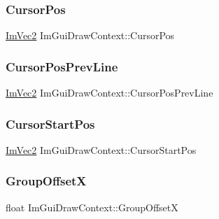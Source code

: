 \hypertarget{struct_im_gui_draw_context_a1f566246492e0995b5182de23633dc9a}{}\label{struct_im_gui_draw_context_a1f566246492e0995b5182de23633dc9a} 
\subsubsection{\texorpdfstring{Cursor\+Pos}{CursorPos}}
{\footnotesize\ttfamily \hyperlink{struct_im_vec2}{Im\+Vec2} Im\+Gui\+Draw\+Context\+::\+Cursor\+Pos}

\hypertarget{struct_im_gui_draw_context_adf64144a8421a21d7350d0452739eca2}{}\label{struct_im_gui_draw_context_adf64144a8421a21d7350d0452739eca2} 
\subsubsection{\texorpdfstring{Cursor\+Pos\+Prev\+Line}{CursorPosPrevLine}}
{\footnotesize\ttfamily \hyperlink{struct_im_vec2}{Im\+Vec2} Im\+Gui\+Draw\+Context\+::\+Cursor\+Pos\+Prev\+Line}

\hypertarget{struct_im_gui_draw_context_aef16fef5d6781908d806479fd37f393f}{}\label{struct_im_gui_draw_context_aef16fef5d6781908d806479fd37f393f} 
\subsubsection{\texorpdfstring{Cursor\+Start\+Pos}{CursorStartPos}}
{\footnotesize\ttfamily \hyperlink{struct_im_vec2}{Im\+Vec2} Im\+Gui\+Draw\+Context\+::\+Cursor\+Start\+Pos}

\hypertarget{struct_im_gui_draw_context_a30473e3e4b3eeba6c8d1acdaaedecba9}{}\label{struct_im_gui_draw_context_a30473e3e4b3eeba6c8d1acdaaedecba9} 
\subsubsection{\texorpdfstring{Group\+OffsetX}{GroupOffsetX}}
{\footnotesize\ttfamily float Im\+Gui\+Draw\+Context\+::\+Group\+OffsetX}

